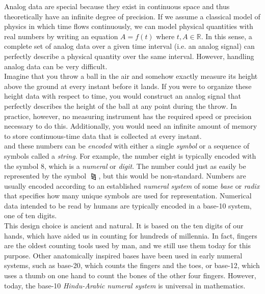 Analog data are special because they exist in continuous space and thus theoretically have an infinite degree of precision. If we assume a classical model of physics in which time flows continuously, we can model physical quantities with real numbers by writing an equation $A=f(t)$ where $t,A\in\mathbb{R}$. In this sense, a complete set of analog data over a given time interval (i.e. an analog signal) can perfectly describe a physical quantity over the same interval. However, handling analog data can be very difficult. \\

Imagine that you throw a ball in the air and somehow exactly measure its height above the ground at every instant before it lands. If you were to organize these height data with respect to time, you would construct an analog signal that perfectly describes the height of the ball at any point during the throw. In practice, however, no measuring instrument has the required speed or precision necessary to do this. Additionally, you would need an infinite amount of memory to store continuous-time data that is collected at every instant. \\


and these numbers can be \textit{encoded} with either a single \textit{symbol} or a sequence of symbols called a \textit{string}. For example, the number eight is typically encoded with the symbol 8, which is a \textit{numeral} or \textit{digit}. The number could just as easily be represented by the symbol $\rtriltri$, but this would be non-standard. Numbers are usually encoded according to an established \textit{numeral system} of some \textit{base} or \textit{radix} that specifies how many unique symbols are used for representation. Numerical data intended to be read by humans are typically encoded in a base-10 system, one of ten digits. \\

This design choice is ancient and natural. It is based on the ten digits of our hands, which have aided us in counting for hundreds of millennia. In fact, fingers are the oldest counting tools used by man, and we still use them today for this purpose. Other anatomically inspired bases have been used in early numeral systems, such as base-20, which counts the fingers and the toes, or base-12, which uses a thumb on one hand to count the bones of the other four fingers. However, today, the base-10 \textit{Hindu-Arabic numeral system} is universal in mathematics. \\

